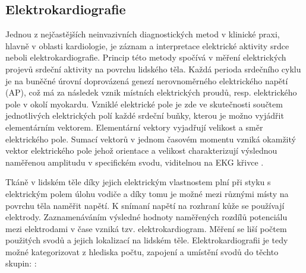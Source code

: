 \subsection{Elektrokardiografie}
\label{section:electrocardiography}
Jednou z nejčastějších neinvazivních diagnostických metod v klinické praxi,
hlavně v oblasti kardiologie, je záznam a interpretace elektrické aktivity srdce
neboli elektrokardiografie. Princip této metody spočívá v měření elektrických
projevů srdeční aktivity na povrchu lidského těla. Každá perioda srdečního cyklu
je na buněčné úrovní doprovázená genezí nerovnoměrného elektrického napětí (AP),
což má za následek vznik místních elektrických proudů, resp. elektrického pole v
okolí myokardu. Vzniklé elektrické pole je zde ve skutečnosti součtem
jednotlivých elektrických polí každé srdeční buňky, kterou je možno vyjádřit
elementárním vektorem. Elementární vektory vyjadřují velikost a směr
elektrického pole. Sumací vektorů v jednom časovém momentu vzniká okamžitý
vektor elektrického pole jehož orientace a velikost charakterizují výslednou
naměřenou amplitudu v specifickém svodu, viditelnou na EKG křivce
\cite{Surawicz2008,Stejfa2006,Kittnar2020}.

Tkáně v lidském těle díky jejich elektrickým vlastnostem plní při styku s
elektrickým polem úlohu vodiče a díky tomu je možné mezi různými místy na
povrchu těla naměřit napětí. K snímaní napětí na rozhraní kůže se používají
elektrody. Zaznamenáváním výsledné hodnoty naměřených rozdílů potenciálu mezi
elektrodami v čase vzniká tzv. elektrokardiogram. Měření se liší počtem
použitých svodů a jejich lokalizací na lidském těle. Elektrokardiografii je tedy
možné kategorizovat z hlediska počtu, zapojení a umístění svodů do těchto
skupin: \cite{Haberl2012,Stejfa2006,Kittnar2020}:

